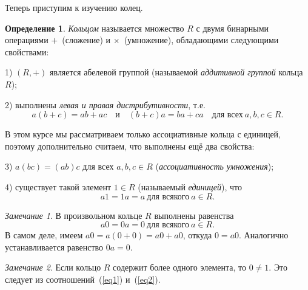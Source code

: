 \documentclass[a4paper,10pt]{amsart}
\theoremstyle{definition}
\newtheorem{definition}{Определение}
\theoremstyle{remark}
\newtheorem{remark}{Замечание}
\begin{document}
\medskip

Теперь приступим к изучению колец.
\begin{definition}
{\it Кольцом} называется множество $R$ с двумя бинарными операциями
\guillemotleft $+$\guillemotright{}~(сложение) и \guillemotleft
$\times$\guillemotright{}~(умножение), обладающими следующими
свойствами:

1) $(R,+)$ является абелевой группой (называемой {\it аддитивной
группой} кольца $R$);

2) выполнены {\it левая и правая дистрибутивности}, т.е.
$$
a(b+c)=ab+ac \quad \text{и} \quad (b+c)a=ba+ca \quad \text{для всех}
\ a,b,c\in R.
$$

В этом курсе мы рассматриваем только ассоциативные кольца с
единицей, поэтому дополнительно считаем, что выполнены ещё два
свойства:

3) $a(bc)=(ab)c$ для всех $a,b,c\in R$ (\textit{ассоциативность
умножения});

4) существует такой элемент $1\in R$ (называемый \textit{единицей}),
что
\begin{equation} \label{eq1}
a1 = 1a = a \ \text{для всякого} \ a \in R.
\end{equation}
\end{definition}

\begin{remark}
В произвольном кольце $R$ выполнены равенства
\begin{equation} \label{eq2}
a0 = 0a = 0 \ \text{для всякого} \ a \in R.
\end{equation}
В самом деле, имеем $a0 = a(0 + 0) = a0 + a0$, откуда $0 = a0$.
Аналогично устанавливается равенство $0a = 0$.
\end{remark}

\begin{remark}
Если кольцо $R$ содержит более одного элемента, то $0\ne 1$. Это
следует из соотношений~(\ref{eq1}) и~(\ref{eq2}).
\end{remark}
\end{document}
